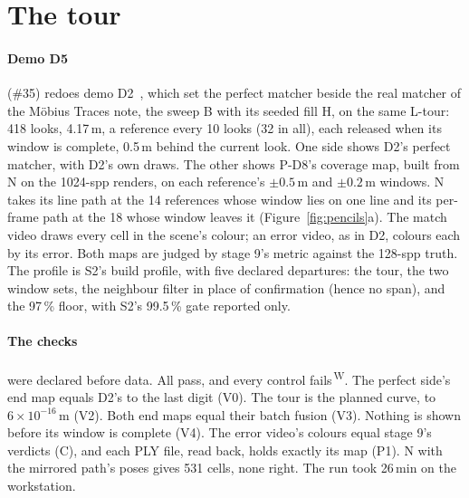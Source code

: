 \documentclass[11pt,a4paper]{article}
\newcommand{\src}[1]{\textsuperscript{\,#1}}
\newcommand{\WS}{\src{W}}   %
\begin{document}
\section{The tour}\label{sec:tour}

\paragraph{Demo D5} (\#35) redoes demo D2~\cite{mobius}, which set the perfect matcher beside the real matcher of the
M\"obius Traces note, the sweep B with its seeded fill H, on the same L-tour: 418 looks, 4.17\,m, a reference every 10
looks (32 in all), each released when its window is complete, 0.5\,m behind the current look. One side shows D2's
perfect matcher, with D2's own draws. The other shows P-D8's coverage map, built from N on the 1024-spp renders, on each
reference's $\pm0.5$\,m and $\pm0.2$\,m windows. N takes its line path at the 14 references whose window lies on one line
and its per-frame path at the 18 whose window leaves it (Figure~\ref{fig:pencils}a). The match video draws every cell in
the scene's colour; an error video, as in D2, colours each by its error. Both maps are judged by stage 9's metric against
the 128-spp truth. The profile is S2's build profile, with five declared departures: the tour, the two window sets, the
neighbour filter in place of confirmation (hence no span), and the 97\,\% floor, with S2's 99.5\,\% gate reported only.

\paragraph{The checks} were declared before data. All pass, and every control fails\WS. The perfect side's end map equals
D2's to the last digit (V0). The tour is the planned curve, to $6\times10^{-16}$\,m (V2). Both end maps equal their batch
fusion (V3). Nothing is shown before its window is complete (V4). The error video's colours equal stage 9's verdicts
(C), and each PLY file, read back, holds exactly its map (P1). N with the mirrored path's poses gives 531 cells, none
right. The run took 26\,min on the workstation.
\end{document}
